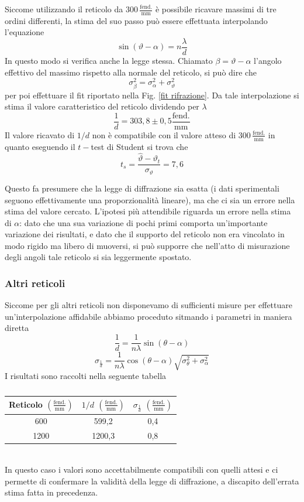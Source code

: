 Siccome utilizzando il reticolo da $300\,\frac{\text{fend.}}{\text{mm}}$ è possibile ricavare massimi di tre ordini differenti, la stima del suo passo può essere effettuata interpolando l'equazione
$$
\sin(\vartheta-\alpha)=n\dfrac{\lambda}{d}
$$
In questo modo si verifica anche la legge stessa. Chiamato $\beta=\vartheta-\alpha$ l'angolo effettivo del massimo rispetto alla normale del reticolo, si può dire che 
$$
\sigma^2_\beta = \sigma_\alpha^2+\sigma_\vartheta^2
$$
per poi effettuare il fit riportato nella Fig. \ref{fit rifrazione}. Da tale interpolazione si stima il valore caratteristico del reticolo dividendo per $\lambda$
$$
\dfrac{1}{d}=303,8\pm 0,5 \frac{\text{fend.}}{\text{mm}}
$$
Il valore ricavato di $1/d$ non è compatibile con il valore atteso di $300\,\frac{\text{fend.}}{\text{mm}}$ in quanto eseguendo il $t-$test di Student si trova che 
$$
t_s=\dfrac{\hat{\vartheta}-\vartheta_t}{\sigma_\vartheta}=7,6
$$

Questo fa presumere che la legge di diffrazione sia esatta (i dati sperimentali seguono effettivamente una proporzionalità lineare), ma che ci sia un errore nella stima del valore cercato. L’ipotesi più attendibile riguarda un errore nella stima di $\alpha$: dato che una sua variazione di pochi primi comporta un’importante variazione dei risultati, e dato che il supporto del reticolo non era vincolato in modo rigido ma libero di muoversi, si può supporre che nell’atto di misurazione degli angoli tale reticolo si sia leggermente spostato.
\subsubsection{Altri reticoli}
Siccome per gli altri reticoli non disponevamo di sufficienti misure per effettuare un'interpolazione affidabile abbiamo proceduto sitmando i parametri in maniera diretta
$$
\frac{1}{d}=\frac{1}{n \lambda} \sin (\theta-\alpha)
$$
$$
\sigma_{\frac{1}{d}}=\frac{1}{n \lambda} \cos (\theta-\alpha) \sqrt{\sigma_{\theta}^{2}+\sigma_{\alpha}^{2}}
$$
I risultati sono raccolti nella seguente tabella
\begin{table}[h!]
    \centering
    \begin{tabular}{ccc}
    \toprule
    Reticolo $(\frac{\text{fend.}}{\text{mm}})$ & $1/d$ $(\frac{\text{fend.}}{\text{mm}})$ & $\sigma_{\frac{1}{d}}$ $(\frac{\text{fend.}}{\text{mm}})$\\
    \midrule
         600 & 599,2 & 0,4 \\
         1200 &  1200,3 & 0,8\\
    \bottomrule
    \end{tabular}
    \caption{}
    \label{tab:my_label}
\end{table}
\\

In questo caso i valori sono accettabilmente compatibili con quelli attesi e ci permette di confermare la validità della legge di diffrazione, a discapito dell’errata stima fatta in precedenza.